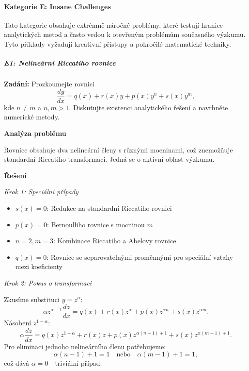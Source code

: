 \paragraph*{Kategorie E: Insane Challenges}
\label{par:kategorie-e-insane}

Tato kategorie obsahuje extrémně náročné problémy, které testují hranice analytických metod a často vedou k otevřeným problémům současného výzkumu. Tyto příklady vyžadují kreativní přístupy a pokročilé matematické techniky.

\vspace{0.8\baselineskip}

\subparagraph*{E1: Nelineární Riccatiho rovnice}
\label{subpar:e1-nelinearni-riccati}

\begin{example}
\label{ex:e1-zobecnene-riccati}

\noindent\textbf{Zadání:} Prozkoumejte rovnici
\[
\frac{dy}{dx} = q(x) + r(x)y + p(x)y^n + s(x)y^m,
\]
kde $n \neq m$ a $n, m > 1$. Diskutujte existenci analytického řešení a navrhněte numerické metody.

\vspace{1.5\baselineskip}

\noindent\textbf{Analýza problému}

\noindent Rovnice obsahuje dva nelineární členy s různými mocninami, což znemožňuje standardní Riccatiho transformaci. Jedná se o aktivní oblast výzkumu.

\vspace{1.5\baselineskip}

\noindent\textbf{Řešení}

\noindent\textit{Krok 1: Speciální případy}

\begin{itemize}
\item $s(x) = 0$: Redukce na standardní Riccatiho rovnici
\item $p(x) = 0$: Bernoulliho rovnice s mocninou $m$
\item $n = 2, m = 3$: Kombinace Riccatiho a Abelovy rovnice
\item $q(x) = 0$: Rovnice se separovatelnými proměnnými pro speciální vztahy mezi koeficienty
\end{itemize}

\noindent\textit{Krok 2: Pokus o transformaci}

Zkusíme substituci $y = z^\alpha$:
\[
\alpha z^{\alpha-1} \frac{dz}{dx} = q(x) + r(x)z^\alpha + p(x)z^{\alpha n} + s(x)z^{\alpha m}.
\]
Násobení $z^{1-\alpha}$:
\[
\alpha \frac{dz}{dx} = q(x)z^{1-\alpha} + r(x)z + p(x)z^{\alpha(n-1)+1} + s(x)z^{\alpha(m-1)+1}.
\]
Pro eliminaci jednoho nelineárního členu potřebujeme:
\[
\alpha(n-1) + 1 = 1 \quad \text{nebo} \quad \alpha(m-1) + 1 = 1,
\]
což dává $\alpha = 0$ - triviální případ.


\end{example}
